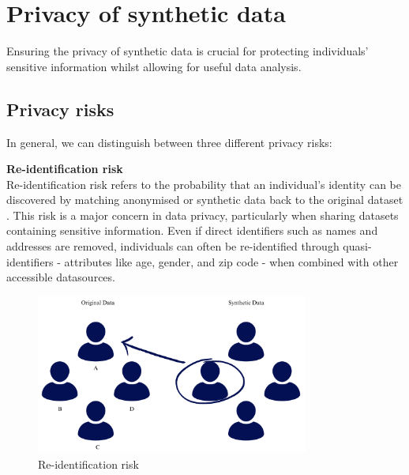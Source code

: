 


\section{Privacy of synthetic data}

Ensuring the privacy of synthetic data is crucial for protecting individuals' sensitive information whilst allowing for useful data analysis.

\subsection{Privacy risks}

In general, we can distinguish between three different privacy risks:

\textbf{Re-identification risk} \\
Re-identification risk refers to the probability that an individual's identity can be discovered by matching anonymised or synthetic data back to the original dataset \cite{ochoa2001reidentification,el2008protecting}. This risk is a major concern in data privacy, particularly when sharing datasets containing sensitive information. Even if direct identifiers such as names and addresses are removed, individuals can often be re-identified through quasi-identifiers - attributes like age, gender, and zip code - when combined with other accessible datasources. 

\vspace{10pt}
\begin{figure}[H]
    \centering
    \includegraphics[width=0.8\textwidth]{Images/Reidentificationrisk.png}
    \caption{Re-identification risk}
    \label{fig:synthesis_1}
\end{figure}
\vspace{10pt}


